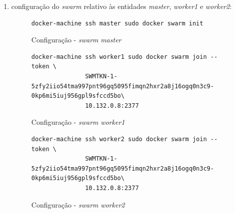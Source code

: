 \documentclass[a4paper]{report}
\begin{document}
{\begin{enumerate}[label=\textbf{\arabic*.}]
            \begin{figure}[H]
                \centering
                \begin{verbatim}
docker-machine create \
               --driver google --google-project ferrous-aleph-271712 \
               --google-zone europe-west1-b \
               --google-machine-type n1-standard-2 \
               --google-disk-size=100 \
               --google-disk-type=pd-ssd \
               --google-machine-image \
       https://www.googleapis.com/compute/v1/projects/centos-cloud/global/images/centos-7-v20200309 \
               worker2
                \end{verbatim}
                \caption{Configuração - Criação da instância associada à entidade \textsl{worker2}}
                \label{fig:3}
            \end{figure}

            De salientar que a designação \texttt{ferrous-aleph-271712} corresponde ao identificador do projeto presente na plataforma \textit{Google Cloud} de um dos elementos que compõem este grupo.
            Assim, esta denominação deve ser substituída pelo nome do projeto do utilizador em causa.

            \item configuração do \textit{swarm} relativo às entidades \textsl{master}, \textsl{worker1} e \textsl{worker2}:
            \begin{figure}[H]
                \centering
                \begin{verbatim}
docker-machine ssh master sudo docker swarm init
                \end{verbatim}
                \caption{Configuração - \textit{swarm} \textsl{master}}
                \label{fig:4}
            \end{figure}

            \begin{figure}[H]
                \centering
                \begin{verbatim}
docker-machine ssh worker1 sudo docker swarm join --token \
               SWMTKN-1-5zfy2iio54tma997pnt96gq5095fimqn2hxr2a8j16ogq0n3c9-0kp6mi5iuj956gpl9sfccd5bo\
               10.132.0.8:2377
                \end{verbatim}
                \caption{Configuração - \textit{swarm} \textsl{worker1}}
                \label{fig:5}
            \end{figure}

            \begin{figure}[H]
                \centering
                \begin{verbatim}
docker-machine ssh worker2 sudo docker swarm join --token \
               SWMTKN-1-5zfy2iio54tma997pnt96gq5095fimqn2hxr2a8j16ogq0n3c9-0kp6mi5iuj956gpl9sfccd5bo\
               10.132.0.8:2377
                \end{verbatim}
                \caption{Configuração - \textit{swarm} \textsl{worker2}}
                \label{fig:6}
            \end{figure}


\end{enumerate}}
\end{document}
